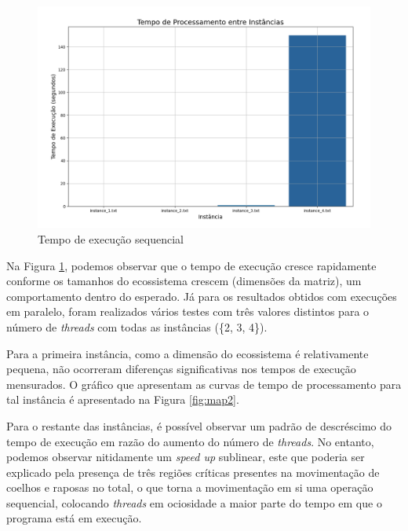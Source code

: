 \documentclass[a4paper, 12pt]{article}
\begin{document}
\vspace*{-0.5cm}
\begin{figure}[H]
    \centering
    \includegraphics[width=1.1\textwidth]{Images/sequential.png}
    \vspace*{-1cm}
    \caption{Tempo de execução sequencial}
    \label{fig:map1}
\end{figure}

Na Figura \ref{fig:map1}, podemos observar que o tempo de execução cresce rapidamente conforme os tamanhos do ecossistema crescem (dimensões da matriz), um comportamento dentro do esperado. Já para os resultados obtidos com execuções em paralelo, foram realizados vários testes com três valores distintos para o número de \emph{threads} com todas as instâncias (\{2, 3, 4\}).

Para a primeira instância, como a dimensão do ecossistema é relativamente pequena, não ocorreram diferenças significativas nos tempos de execução mensurados. O gráfico que apresentam as curvas de tempo de processamento para tal instância é apresentado na Figura \ref{fig:map2}.

Para o restante das instâncias, é possível observar um padrão de descréscimo do tempo de execução em razão do aumento do número de \emph{threads}. No entanto, podemos observar nitidamente um \emph{speed up} sublinear, este que poderia ser explicado pela presença de três regiões críticas presentes na movimentação de coelhos e raposas no total, o que torna a movimentação em si uma operação sequencial, colocando \emph{threads} em ociosidade a maior parte do tempo em que o programa está em execução.
\end{document}
